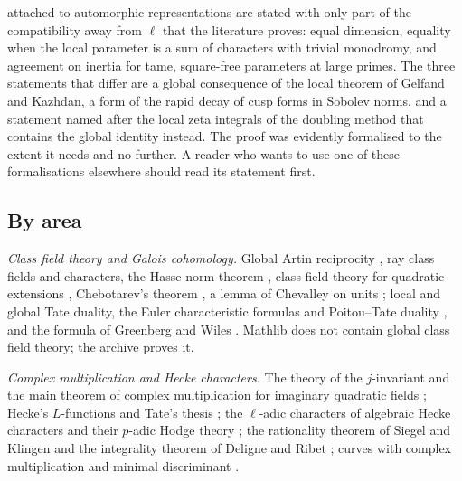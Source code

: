 attached to automorphic representations are stated with only part of the compatibility away
from $\ell$ that the literature proves: equal dimension, equality when the local parameter is
a sum of characters with trivial monodromy, and agreement on inertia for tame, square-free
parameters at large primes. The three statements that differ are a
global consequence of the local theorem of Gelfand and Kazhdan, a form of the rapid decay of
cusp forms in Sobolev norms, and a statement named after the local zeta integrals of the
doubling method that contains the global identity instead. The proof was evidently formalised
to the extent it needs and no further. A reader who wants to use one of these formalisations
elsewhere should read its statement first.

\subsection{By area}
\emph{Class field theory and Galois cohomology.} Global Artin reciprocity
\cite{takagi1920theorie,artin1927beweis,chevalley1940theorie,tate1967global}, ray class fields
and characters, the Hasse norm theorem \cite{hasse1924darstellbarkeit,hasse1931beweis}, class
field theory for quadratic extensions \cite{hilbert1899theorie}, Chebotarev's theorem
\cite{chebotarev1926bestimmung}, a lemma of Chevalley on units \cite{chevalley1951deux}; local
and global Tate duality, the Euler characteristic formulas and Poitou--Tate duality
\cite{tate1963duality,poitou1966remarques,milne1986arithmetic}, and the formula of Greenberg
and Wiles \cite{wiles1995modular,darmon1995fermat}. Mathlib does not contain global class field
theory; the archive proves it.

\emph{Complex multiplication and Hecke characters.} The theory of the $j$-invariant and the
main theorem of complex multiplication for imaginary quadratic fields
\cite{hasse1927neue,shimura1971introduction}; Hecke's $L$-functions and Tate's thesis
\cite{hecke1918neue,hecke1920neue,tate1967fourier}; the $\ell$-adic characters of algebraic
Hecke characters and their $p$-adic Hodge theory \cite{serre1968abelian}; the rationality
theorem of Siegel and Klingen \cite{klingen1962werte,siegel1969berechnung} and the integrality
theorem of Deligne and Ribet \cite{deligne1980values,cassounogues1979valeurs}; curves with
complex multiplication and minimal discriminant \cite{gross1980arithmetic,gross1982minimal}.

